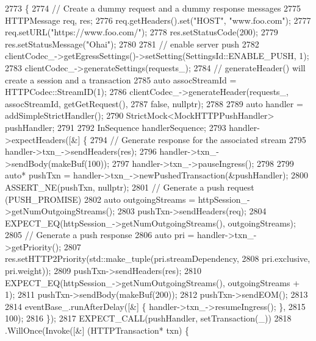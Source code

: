 \begin{DoxyCode}
2773                                                \{
2774   \textcolor{comment}{// Create a dummy request and a dummy response messages}
2775   HTTPMessage req, res;
2776   req.getHeaders().set(\textcolor{stringliteral}{"HOST"}, \textcolor{stringliteral}{"www.foo.com"});
2777   req.setURL(\textcolor{stringliteral}{"https://www.foo.com/"});
2778   res.setStatusCode(200);
2779   res.setStatusMessage(\textcolor{stringliteral}{"Ohai"});
2780 
2781   \textcolor{comment}{// enable server push}
2782   clientCodec\_->getEgressSettings()->setSetting(SettingsId::ENABLE\_PUSH, 1);
2783   clientCodec\_->generateSettings(requests\_);
2784   \textcolor{comment}{// generateHeader() will create a session and a transaction}
2785   \textcolor{keyword}{auto} assocStreamId = HTTPCodec::StreamID(1);
2786   clientCodec\_->generateHeader(requests\_, assocStreamId, getGetRequest(),
2787                                \textcolor{keyword}{false}, \textcolor{keyword}{nullptr});
2788 
2789   \textcolor{keyword}{auto} handler = addSimpleStrictHandler();
2790   StrictMock<MockHTTPPushHandler> pushHandler;
2791 
2792   InSequence handlerSequence;
2793   handler->expectHeaders([&] \{
2794       \textcolor{comment}{// Generate response for the associated stream}
2795       handler->txn\_->sendHeaders(res);
2796       handler->txn\_->sendBody(makeBuf(100));
2797       handler->txn\_->pauseIngress();
2798 
2799       \textcolor{keyword}{auto}* pushTxn = handler->txn\_->newPushedTransaction(&pushHandler);
2800       ASSERT\_NE(pushTxn, \textcolor{keyword}{nullptr});
2801       \textcolor{comment}{// Generate a push request (PUSH\_PROMISE)}
2802       \textcolor{keyword}{auto} outgoingStreams = httpSession\_->getNumOutgoingStreams();
2803       pushTxn->sendHeaders(req);
2804       EXPECT\_EQ(httpSession\_->getNumOutgoingStreams(), outgoingStreams);
2805       \textcolor{comment}{// Generate a push response}
2806       \textcolor{keyword}{auto} pri = handler->txn\_->getPriority();
2807       res.setHTTP2Priority(std::make\_tuple(pri.streamDependency,
2808                                            pri.exclusive, pri.weight));
2809       pushTxn->sendHeaders(res);
2810       EXPECT\_EQ(httpSession\_->getNumOutgoingStreams(), outgoingStreams + 1);
2811       pushTxn->sendBody(makeBuf(200));
2812       pushTxn->sendEOM();
2813 
2814       eventBase\_.runAfterDelay([&] \{ handler->txn\_->resumeIngress(); \},
2815                                100);
2816     \});
2817   EXPECT\_CALL(pushHandler, setTransaction(\_))
2818     .WillOnce(Invoke([&] (HTTPTransaction* txn) \{

\end{DoxyCode}
